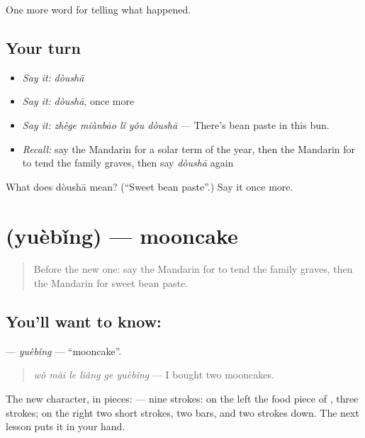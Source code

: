 \begin{grammarlens}[title={What you've built}]
One more word for telling what happened.
\end{grammarlens}

\subsection*{Your turn}
\begin{itemize}
\raggedright
  \item \emph{Say it:} \emph{dòushā}
  \item \emph{Say it:} \emph{dòushā}, once more
  \item \emph{Say it:} \emph{zhège miànbāo lǐ yǒu dòushā} — There's bean paste in this bun.
  \item \emph{Recall:} say the Mandarin for a solar term of the year, then the Mandarin for to tend the family graves, then say \emph{dòushā} again
\end{itemize}

\begin{tcolorbox}[breakable,colback=teal!4,colframe=teal!35!black,title={Before you move on}]
What does dòushā mean? (\textquotedblleft{}Sweet bean paste\textquotedblright{}.) Say it once more.
\end{tcolorbox}
\section[\texorpdfstring{\zh{月饼} (yuèbǐng)}{月饼 (yuèbǐng)}]{ (yuèbǐng) — mooncake}

\label{lesson:ZH-C341-yuebing}



\begin{quote}
Before the new one: say the Mandarin for to tend the family graves, then the Mandarin for sweet bean paste.
\end{quote}

\subsection*{You'll want to know: }
\textbf{} — \emph{yuèbǐng} — \textquotedblleft{}mooncake\textquotedblright{}.

\begin{quote}
\textbf{} \emph{wǒ mǎi le liǎng ge yuèbǐng} — I bought two mooncakes.
\end{quote}

The new character, in pieces:  — nine strokes: on the left the food piece of , three strokes; on the right two short strokes, two bars, and two strokes down. The next lesson puts it in your hand.

